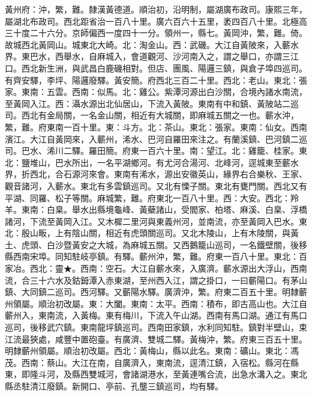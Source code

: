 \begin{pinyinscope}
黃州府：沖，繁，難。隸漢黃德道。順治初，沿明制，屬湖廣布政司。康熙三年，屬湖北布政司。西北距省治一百八十里。廣六百六十五里，袤四百八十里。北極高三十度二十六分。京師偏西一度四十一分。領州一，縣七。黃岡沖，繁，難。倚。故城西北黃岡山。城東北大崎。北：淘金山。西：武磯。大江自黃陂來，入蘄水界。東巴水，西舉水，自麻城入，會道觀河、沙河南入之，謂之舉口，亦謂三江口。西北新生洲，與武昌白鹿磯相對。但店、團風、陽邏三鎮，與倉子埠四巡司。有齊安驛，李坪、陽邏廢驛。黃安簡。府西北三百二十里。西北：老山。東北：張家。東南：五雲。西南：似馬。北：雞公。紫潭河源出白沙關，合境內諸水南流，至黃岡入江。西：灄水源出北仙居山，下流入黃陂。東南有中和鎮、黃陂站二巡司。西北有金局關，一名金山關，相近有大城關，即麻城五關之一也。蘄水沖，繁，難。府東南一百十里。東：斗方。北：茶山。東北：張家。東南：仙女。西南濱江。大江自黃岡來，入蘄州，浠水、巴河自羅田來注之。有蘭溪鎮、巴河鎮二巡司。巴水、浠川二驛。羅田簡。府東一百六十里。南：望江。北：雞籠、桂家。東北：鹽堆山，巴水所出，一名平湖鄉河。有尤河合湯河、北峰河，逕城東至蘄水界，折西北，合石源河來會。東南有浠水，源出安徽英山，緣界右合樂秋、王家、觀音諸河，入蘄水。東北有多雲鎮巡司。又北有慄子關。東北有甕門關。西北又有平湖、同羅、松子等關。麻城繁，難。府東北一百八十里。西：大安。西北：羚羊。東南：白臬。舉水出縣境龜峰、黃蘗諸山，受閻家、柏塔、麻溪、白臬、浮橋諸河，下流至黃岡入江。又木樨二里河與東義州河，並南流，亦至黃岡入巴水。東北：殷山畈，上有陰山關，相近有虎頭關巡司。又北木陵山，上有木陵關，與黃土、虎頭、白沙暨黃安之大城，為麻城五關。又西鵝籠山巡司，一名鐵壁關，後移縣西南宋埠。同知駐岐亭鎮。有驛。蘄州沖，繁，難。府東一百八十里。東北：百家冶。西北：靈★。西南：空石。大江自蘄水來，入廣濟。蘄水源出大浮山，西南流，合三十六水及鈷鉧潭入赤東湖，至州西入江，謂之掛口，一曰蘄陽口。有茅山鎮、大同鎮二巡司。西河驛。又蘄陽水驛。廣濟沖，繁。府東二百五十里。明隸蘄州領屬。順治初改屬。東：大闔。東南：太平。西南：積布，即古高山也。大江自蘄州入，東南流，入黃梅。東有梅川，下流入午山湖。西南有馬口湖。通江有馬口巡司，後移武穴鎮。東南龍坪鎮巡司。西南田家鎮，水利同知駐。鎮對半壁山，束江流最狹處，咸豐中置砲臺。有廣濟、雙城二驛。黃梅沖，繁。府東三百五十里。明隸蘄州領屬。順治初改屬。西北：黃梅山，縣以此名。東南：礦山。東北：馮茂。西南：蔡山。大江在南，自廣濟入，東南流，逕清江鎮，入宿松。縣河在縣東，即隆斗河，及縣西雙城河，會諸湖港水，至黃連嘴合流，出急水溝入之。東北縣丞駐清江廢鎮。新開口、亭前、孔壟三鎮巡司，均有驛。


\end{pinyinscope}
